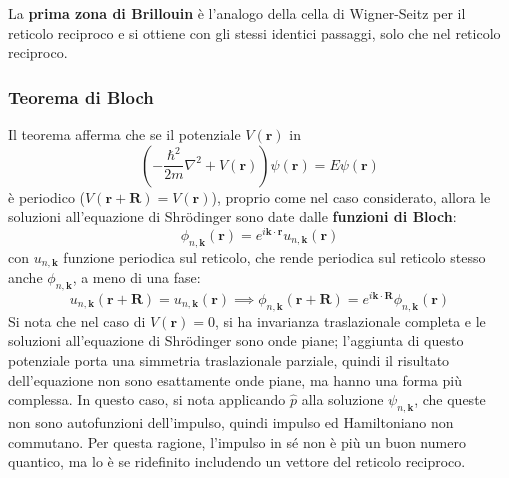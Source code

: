 \documentclass[10pt, a4paper]{scrartcl}
\numberwithin{equation}{subsection}
\theoremstyle{style1}
\begin{document}
La \textbf{prima zona di Brillouin} \`e l'analogo della cella di Wigner-Seitz per il reticolo reciproco e si ottiene con gli stessi identici passaggi, solo che nel reticolo reciproco.
 
\subsubsection{Teorema di Bloch}
Il teorema afferma che se il potenziale $V(\mathbf{r} )$ in
\[
\left( - \frac{\hbar ^2}{2m}\nabla ^2 + V(\mathbf{r} )\right) \psi (\mathbf{r} ) = E \psi (\mathbf{r} )
\] 
\`e periodico ($V(\mathbf{r} +\mathbf{R} )=V(\mathbf{r} )$), proprio come nel caso considerato, allora le soluzioni all'equazione di Shr\"odinger sono date dalle \textbf{funzioni di Bloch}:
\begin{equation}
	\phi _{n, \mathbf{k} } (\mathbf{r} ) = e^{i \mathbf{k} \cdot \mathbf{r} } u _{n, \mathbf{k} } (\mathbf{r} )
\end{equation}
con $u_{n, \mathbf{k} } $ funzione periodica sul reticolo, che rende periodica sul reticolo stesso anche  $\phi _{n,\mathbf{k} } $, a meno di una fase:
\[
u_{n,\mathbf{k} } (\mathbf{r} + \mathbf{R} ) = u_{n,\mathbf{k} } (\mathbf{r} ) \implies \phi _{n,\mathbf{k} } (\mathbf{r} + \mathbf{R} ) = e^{i \mathbf{k} \cdot \mathbf{R} } \phi _{n,\mathbf{k} } (\mathbf{r} ) 
\] 
Si nota che nel caso di $V(\mathbf{r}) =0$, si ha invarianza traslazionale completa e le soluzioni all'equazione di Shr\"odinger sono onde piane; l'aggiunta di questo potenziale porta una simmetria traslazionale parziale, quindi il risultato dell'equazione non sono esattamente onde piane, ma hanno una forma pi\`u complessa. 
In questo caso, si nota applicando $\hat{p}$ alla soluzione $\psi _{n,\mathbf{k} } $, che queste non sono autofunzioni dell'impulso, quindi impulso ed Hamiltoniano non commutano.
Per questa ragione, l'impulso in s\'e non \`e pi\`u un buon numero quantico, ma lo \`e se ridefinito includendo un vettore del reticolo reciproco.
\end{document}
